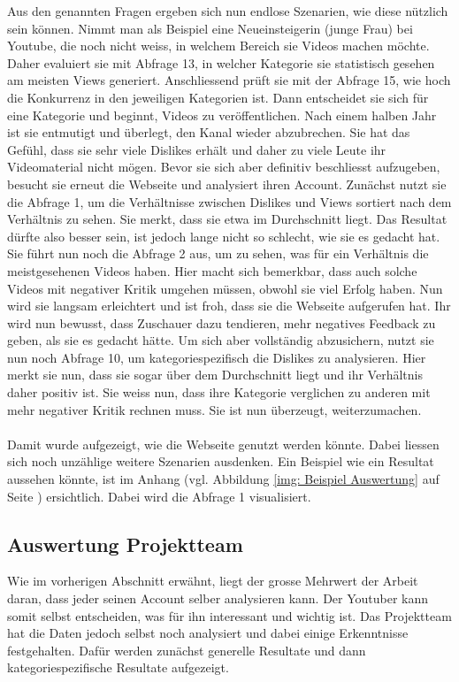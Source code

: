 \documentclass[12pt,titlepage]{article}
\begin{document}
Aus den genannten Fragen ergeben sich nun endlose Szenarien, wie diese nützlich sein können. Nimmt man als Beispiel eine Neueinsteigerin (junge Frau) bei Youtube, die noch nicht weiss, in welchem Bereich sie Videos machen möchte. Daher evaluiert sie mit Abfrage 13, in welcher Kategorie sie statistisch gesehen am meisten Views generiert. Anschliessend prüft sie mit der Abfrage 15, wie hoch die Konkurrenz in den jeweiligen Kategorien ist. Dann entscheidet sie sich für eine Kategorie und beginnt, Videos zu veröffentlichen. Nach einem halben Jahr ist sie entmutigt und überlegt, den Kanal wieder abzubrechen. Sie hat das Gefühl, dass sie sehr viele Dislikes erhält und daher zu viele Leute ihr Videomaterial nicht mögen. Bevor sie sich aber definitiv beschliesst aufzugeben, besucht sie erneut die Webseite und analysiert ihren Account. Zunächst nutzt sie die Abfrage 1, um die Verhältnisse zwischen Dislikes und Views sortiert nach dem Verhältnis zu sehen. Sie merkt, dass sie etwa im Durchschnitt liegt. Das Resultat dürfte also besser sein, ist jedoch lange nicht so schlecht, wie sie es gedacht hat. Sie führt nun noch die Abfrage 2 aus, um zu sehen, was für ein Verhältnis die meistgesehenen Videos haben. Hier macht sich bemerkbar, dass auch solche Videos mit negativer Kritik umgehen müssen, obwohl sie viel Erfolg haben. Nun wird sie langsam erleichtert und ist froh, dass sie die Webseite aufgerufen hat. Ihr wird nun bewusst, dass Zuschauer dazu tendieren, mehr negatives Feedback zu geben, als sie es gedacht hätte. Um sich aber vollständig abzusichern, nutzt sie nun noch Abfrage 10, um kategoriespezifisch die Dislikes zu analysieren. Hier merkt sie nun, dass sie sogar über dem Durchschnitt liegt und ihr Verhältnis daher positiv ist. Sie weiss nun, dass ihre Kategorie verglichen zu anderen mit mehr negativer Kritik rechnen muss. Sie ist nun überzeugt, weiterzumachen. \\
\\
Damit wurde aufgezeigt, wie die Webseite genutzt werden könnte. Dabei liessen sich noch unzählige weitere Szenarien ausdenken. Ein Beispiel wie ein Resultat aussehen könnte, ist im Anhang (vgl. Abbildung \ref{img: Beispiel Auswertung} auf Seite \pageref{img: Beispiel Auswertung}) ersichtlich. Dabei wird die Abfrage 1 visualisiert. 


\subsection{Auswertung Projektteam}
Wie im vorherigen Abschnitt erwähnt, liegt der grosse Mehrwert der Arbeit daran, dass jeder seinen Account selber analysieren kann. Der Youtuber kann somit selbst entscheiden, was für ihn interessant und wichtig ist. Das Projektteam hat die Daten jedoch selbst noch analysiert und dabei einige Erkenntnisse festgehalten. Dafür werden zunächst generelle Resultate und dann kategoriespezifische Resultate aufgezeigt.  
\end{document}
